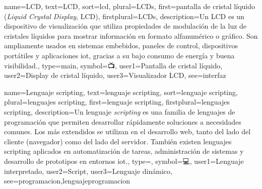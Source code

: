 	
	{
		name={LCD},
		text={LCD},
		sort={lcd},
		plural={LCDs},
		first={pantalla de cristal l{\'i}quido (\textit{Liquid Crystal Display}, LCD)},
		firstplural={LCDs},
		description={Un LCD es un dispositivo de visualizaci{\'o}n que utiliza propiedades de modulaci{\'o}n de la luz de cristales l{\'i}quidos para mostrar informaci{\'o}n en formato alfanum{\'e}rico o gr{\'a}fico. Son ampliamente usados en sistemas embebidos, paneles de control, dispositivos port{\'a}tiles y aplicaciones \gls{iot}, gracias a su bajo consumo de energ{\'i}a y buena visibilidad.},
		type=main,
		symbol={📺},
		user1={Pantalla de cristal l{\'i}quido},
		user2={Display de cristal l{\'i}quido},
		user3={Visualizador LCD},
		see={interfaz}
	}
	
	{
		name={Lenguaje scripting},
		text={lenguaje scripting},
		sort={lenguaje scripting},
		plural={lenguajes scripting},
		first={lenguaje scripting},
		firstplural={lenguajes scripting},
		description={Un lenguaje \textit{scripting} es una familia de lenguajes de programaci{\'o}n que permiten desarrollar r{\'a}pidamente soluciones a necesidades comunes. Los m{\'a}s extendidos se utilizan en el desarrollo web, tanto del lado del cliente (navegador) como del lado del servidor. Tambi{\'e}n existen lenguajes scripting aplicados en automatizaci{\'o}n de tareas, administraci{\'o}n de sistemas y desarrollo de prototipos en entornos \gls{iot}.},
		type=\glsdefaulttype,
		symbol={💻},
		user1={Lenguaje interpretado},
		user2={Script},
		user3={Lenguaje din{\'a}mico},
		see={programacion,lenguajeprogramacion}
	}
	
	
